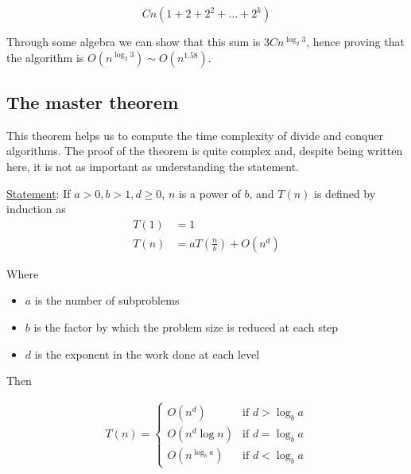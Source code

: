 \documentclass[10pt]{extarticle}
\begin{document}
$$
    Cn\left(1+2+2^2+\dots+2^k\right)
$$

Through some algebra we can show that this sum is $3Cn^{\log_{2}3}$,
hence proving that the algorithm is $O(n^{\log_{2}3}) \sim O(n^{1.58})$.

\subsection{The master theorem}

This theorem helps us to compute the time complexity of divide and conquer algorithms.
The proof of the theorem is quite complex and, despite being written here, it is not as important as understanding the statement.

\underline{Statement}: If $a > 0, b > 1, d \ge 0$, $n$ is a power of $b$, and
$T(n)$ is defined by induction as
\begin{align*}
    T(1) & = 1                                   \\
    T(n) & = aT\left(\frac{n}{b}\right) + O(n^d)
\end{align*}

Where
\begin{itemize}
    \item $a$ is the number of subproblems
    \item $b$ is the factor by which the problem size is reduced at each step
    \item $d$ is the exponent in the work done at each level
\end{itemize}

Then

\begin{align*}
    T(n) = \begin{cases}
               O(n^d)          & \text{if } d > \log_b a \\
               O(n^d \log n)   & \text{if } d = \log_b a \\
               O(n^{\log_b a}) & \text{if } d < \log_b a
           \end{cases}
\end{align*}
\end{document}
